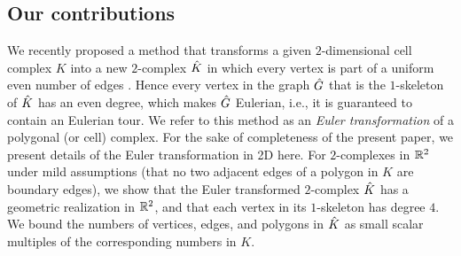 \subsection{Our contributions} \label{ssec:contribaddit}
We recently proposed a method that transforms a given $2$-dimensional cell complex $K$ into a new $2$-complex $\hat{K}$ in which every vertex is part of a uniform even number of edges \cite{GuKr2018}.
Hence every vertex in the graph $\hat{G}$ that is the $1$-skeleton of $\hat{K}$ has an even degree, which makes $\hat{G}$ Eulerian, i.e., it is guaranteed to contain an Eulerian tour.
We refer to this method as an \emph{Euler transformation} of a polygonal (or cell) complex.
For the sake of completeness of the present paper, we present details of the Euler transformation in 2D here.
For $2$-complexes in ${\mathbb R}^2$ under mild assumptions (that no two adjacent edges of a polygon in $K$ are boundary edges), we show that the Euler transformed $2$-complex $\hat{K}$ has a geometric realization in ${\mathbb R}^2$, and that each vertex in its $1$-skeleton has degree $4$.
We bound the numbers of vertices, edges, and polygons in $\hat{K}$ as small scalar multiples of the corresponding numbers in $K$.
\begin{comment}
We prove corresponding results for $3$-complexes in $\R^3$ under an additional assumption that each vertex in $K$ is connected to three edges in a $3$-cell that contains the vertex, i.e., the degree of each vertex in the $1$-skeleton of each $3$-cell in $K$ containing the vertex is $3$.
In this setting, every vertex in $\hG$ is shown to have a degree of $6$.
Next, we presents bounds on parameters measuring geometric quality (aspect ratios) of $\hK$ in terms of the corresponding parameters of $K$ (for $d=2$).
One can control these quality measures by choosing user-defined offset parameters appropriately.
\end{comment}

